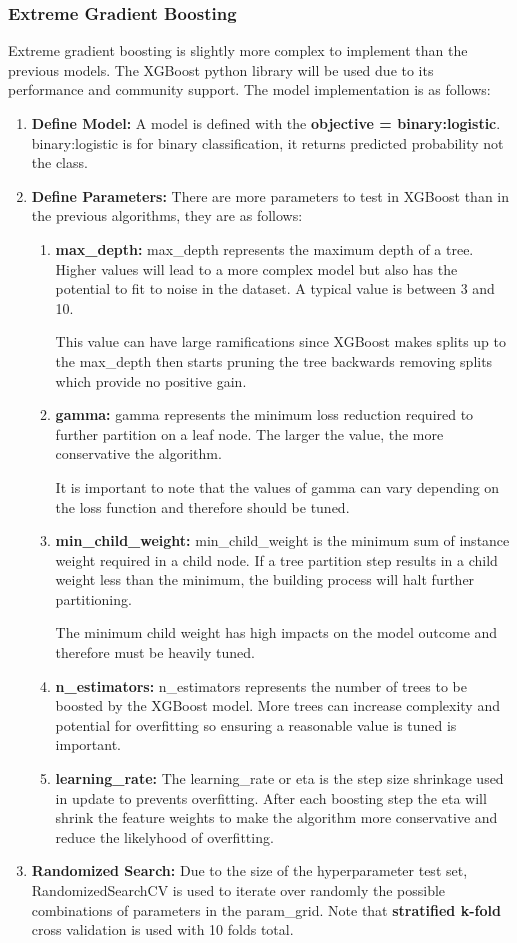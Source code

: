 \documentclass[11pt]{article}
\begin{document}
	\subsubsection{Extreme Gradient Boosting}
		Extreme gradient boosting is slightly more complex to implement than the previous models. The XGBoost python library will be used due to its performance and community support. The model implementation is as follows:
		
		\begin{enumerate}
			\item \textbf{Define Model:} A model is defined with the \textbf{objective = binary:logistic}. binary:logistic is for binary classification, it returns predicted probability not the class.
			\item \textbf{Define Parameters:} There are more parameters to test in XGBoost than in the previous algorithms, they are as follows:
			\begin{enumerate}
				\item \textbf{max\_depth:} max\_depth represents the maximum depth of a tree. Higher values will lead to a more complex model but also has the potential to fit to noise in the dataset. A typical value is between 3 and 10.
				
				This value can have large ramifications since XGBoost makes splits up to the max\_depth then starts pruning the tree backwards removing splits which provide no positive gain.
				\item \textbf{gamma:} gamma represents the minimum loss reduction required to further partition on a leaf node. The larger the value, the more conservative the algorithm. 
				
				It is important to note that the values of gamma can vary depending on the loss function and therefore should be tuned.
				\item \textbf{min\_child\_weight:} min\_child\_weight is the minimum sum of instance weight required in a child node. If a tree partition step results in a child weight less than the minimum, the building process will halt further partitioning. 
				
				The minimum child weight has high impacts on the model outcome and therefore must be heavily tuned.
				\item \textbf{n\_estimators:} n\_estimators represents the number of trees to be boosted by the XGBoost model. More trees can increase complexity and potential for overfitting so ensuring a reasonable value is tuned is important.
				\item \textbf{learning\_rate:} The learning\_rate or eta is the step size shrinkage used in update to prevents overfitting. After each boosting step the eta will shrink the feature weights to make the algorithm more conservative and reduce the likelyhood of overfitting. 
			\end{enumerate}
			\item \textbf{Randomized Search:} Due to the size of the hyperparameter test set, RandomizedSearchCV is used to iterate over randomly the possible combinations of parameters in the param\_grid. Note that \textbf{stratified k-fold} cross validation is used with 10 folds total. 
	\end{enumerate}
\end{document}
